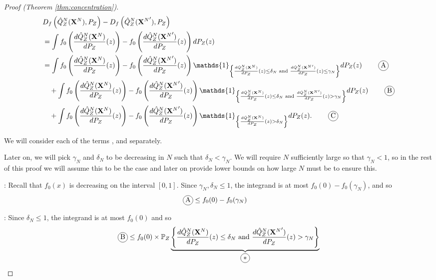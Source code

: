 \begin{proof}[Proof (Theorem \ref{thm:concentration})]
\begin{align*}
    & D_f\left( \hat{Q}_Z^N(\XN) , P_Z\right) - D_f\left( \hat{Q}_Z^N({\XN}') , P_Z\right)  \\
    &= \int f_0\left( \frac{d\hat{Q}_Z^N(\XN)}{dP_Z}(z) \right) - f_0\left( \frac{d\hat{Q}_Z^N({\XN}')}{dP_Z}(z) \right) dP_Z(z)  \\
    &= \int f_0\left( \frac{d\hat{Q}_Z^N(\XN)}{dP_Z}(z) \right) - f_0\left( \frac{d\hat{Q}_Z^N({\XN}')}{dP_Z}(z) \right) \mathds{1}_{\left\lbrace \frac{d\hat{Q}_Z^N(\XN)}{dP_Z}(z) \leq \delta_N \text{ and } \frac{d\hat{Q}_Z^N({\XN}')}{dP_Z}(z) \leq \gamma_N \right\rbrace} dP_Z(z) \tag*{\encircle{A}}\\
    & \quad + \int f_0\left( \frac{d\hat{Q}_Z^N(\XN)}{dP_Z}(z) \right) - f_0\left( \frac{d\hat{Q}_Z^N({\XN}')}{dP_Z}(z) \right) \mathds{1}_{\left\lbrace \frac{d\hat{Q}_Z^N(\XN)}{dP_Z}(z) \leq \delta_N \text{ and } \frac{d\hat{Q}_Z^N({\XN}')}{dP_Z}(z) > \gamma_N \right\rbrace} dP_Z(z) \tag*{\encircle{B}}\\
    & \quad + \int f_0\left( \frac{d\hat{Q}_Z^N(\XN)}{dP_Z}(z) \right) - f_0\left( \frac{d\hat{Q}_Z^N({\XN}')}{dP_Z}(z) \right) \mathds{1}_{\left\lbrace \frac{d\hat{Q}_Z^N(\XN)}{dP_Z}(z) > \delta_N \right\rbrace} dP_Z(z). \tag*{\encircle{C}}
\end{align*}

We will consider each of the terms ,  and   separately.

Later on, we will pick $\gamma_N$ and $\delta_N$ to be decreasing in $N$ such that $\delta_N < \gamma_N$.
We will require $N$ sufficiently large so that $\gamma_N< 1$, so in the rest of this proof we will assume this to be the case and later on provide lower bounds on how large $N$ must be to ensure this.

: 
Recall that $f_0(x)$ is decreasing on the interval $[0,1]$.
Since $\gamma_N, \delta_N \leq 1$, 
the integrand is at most $f_0(0) - f_0(\gamma_N)$, and so 
\begin{align*}
    \encircle{A} &\leq f_0(0) - f_0(\gamma_N)
\end{align*}


:
Since $\delta_N \leq 1$,
the integrand is at most $f_0(0)$ and so
\begin{align*}
    \encircle{B} &\leq f_0(0) \times \mathbb{P}_Z
    \underbrace{
    \left\lbrace \frac{d\hat{Q}_Z^N(\XN)}{dP_Z}(z) \leq \delta_N \text{ and } \frac{d\hat{Q}_Z^N({\XN}')}{dP_Z}(z) > \gamma_N \right\rbrace}_{\encircle{$*$}} \\
\end{align*}


\end{proof}
